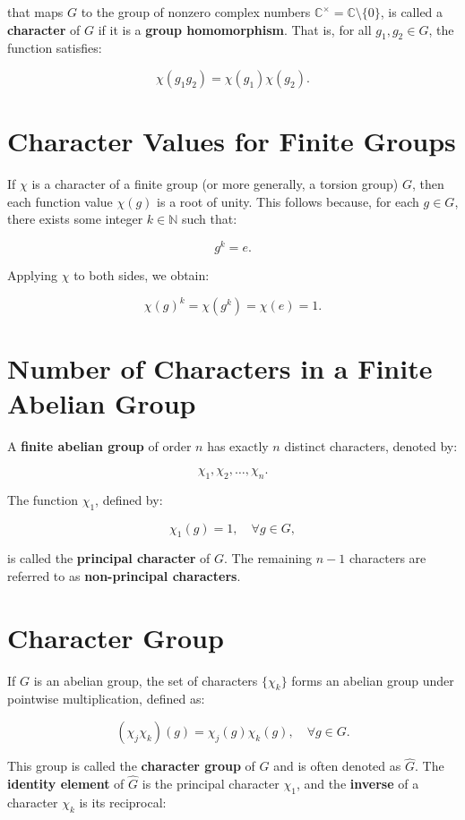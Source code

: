 \documentclass[11pt]{article}
\theoremstyle{definition}
\begin{document}
that maps \( G \) to the group of nonzero complex numbers  \(\mathbb{C}^{\times} = \mathbb{C} \setminus \{0\}\), is called a \textbf{character} of \( G \) if it is a \textbf{group homomorphism}. That is, for all \( g_1, g_2 \in G \), the function satisfies:  

\[
\chi(g_1 g_2) = \chi(g_1) \chi(g_2).
\]

\section*{Character Values for Finite Groups}

If \( \chi \) is a character of a finite group (or more generally, a torsion group) \( G \), then each function value \( \chi(g) \) is a root of unity. This follows because, for each \( g \in G \), there exists some integer \( k \in \mathbb{N} \) such that:  

\[
g^k = e.
\]

Applying \( \chi \) to both sides, we obtain:  

\[
\chi(g)^k = \chi(g^k) = \chi(e) = 1.
\]


\section*{Number of Characters in a Finite Abelian Group}

A \textbf{finite abelian group} of order \( n \) has exactly \( n \) distinct characters, denoted by:  

\[
\chi_1, \chi_2, \dots, \chi_n.
\]

The function \( \chi_1 \), defined by:  

\[
\chi_1(g) = 1, \quad \forall g \in G,
\]

is called the \textbf{principal character} of \( G \). The remaining \( n-1 \) characters are referred to as \textbf{non-principal characters}.

\section*{Character Group}

If \( G \) is an abelian group, the set of characters \( \{\chi_k\} \) forms an abelian group under pointwise multiplication, defined as:  

\[
(\chi_j \chi_k)(g) = \chi_j(g) \chi_k(g), \quad \forall g \in G.
\]

This group is called the \textbf{character group} of \( G \) and is often denoted as $\hat{G}$.  
The \textbf{identity element} of \( \hat{G} \) is the principal character \( \chi_1 \), and the \textbf{inverse} of a character \( \chi_k \) is its reciprocal:  
\end{document}
